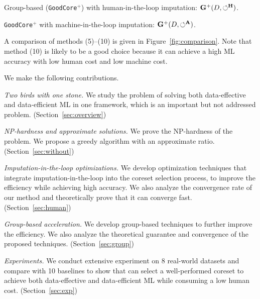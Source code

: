 \bi
\item[(9)] Group-based \ours (\texttt{GoodCore}$^+$) with human-in-the-loop imputation: $\mathbf{G}^+(D, \circlearrowleft^\mathbf{H})$.
\item[(10)] \texttt{GoodCore}$^+$ with machine-in-the-loop imputation: $\mathbf{G}^+(D, \circlearrowleft^\mathbf{A})$.
\ei

A comparison of methods (5)--(10) is given in Figure~\ref{fig:comparison}. Note that method (10) is likely to be a good choice because it can achieve a high ML accuracy with low human cost and low machine cost.
%


We make the following contributions.

\be
	\item[(i)] \textit{Two birds with one stone.} 
	We study the problem of solving both data-effective and data-efficient ML in one framework, which is an important but not addressed problem.
 	(Section~\ref{sec:overview})

 	\item[(ii)] \textit{NP-hardness and approximate solutions.}
	We prove the NP-hardness of the problem. We propose a greedy algorithm with an approximate ratio. 
	(Section~\ref{sec:without})

	\item[(iii)] \textit{Imputation-in-the-loop optimizations.}
	We develop optimization techniques that integrate imputation-in-the-loop into the coreset selection process, to improve the efficiency while achieving high accuracy. We also analyze the convergence rate of our method and theoretically prove that it can converge fast. 
	(Section~\ref{sec:human})
	
	\item[(iv)] \textit{Group-based acceleration.}
	We develop group-based techniques to further improve the efficiency. We also analyze the theoretical guarantee and convergence of the proposed techniques. 
	(Section~\ref{sec:group})



	\item[(v)] \textit{Experiments.}
	We conduct extensive experiment on 8 real-world datasets and compare with 10 baselines to show that \ours can select a well-performed coreset to achieve both data-effective and data-efficient ML while consuming a low human cost. 
	(Section~\ref{sec:exp})
\ee

